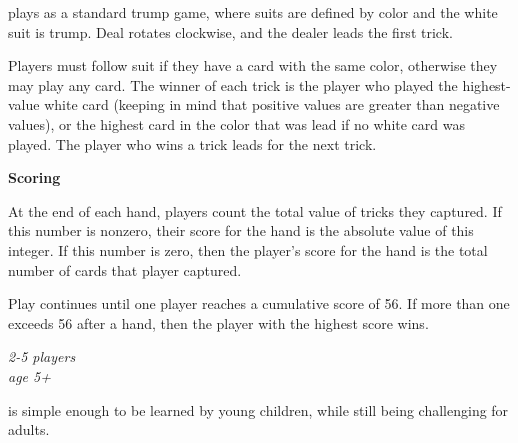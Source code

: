 \documentclass[11pt]{article}
\newcommand\myssection[1]{\begin{center}\bf\small\noindent #1\end{center}}
\begin{document}
 plays as a standard trump game, where suits
are defined by color and the white suit is trump.  Deal rotates
clockwise, and the dealer leads the first trick.

Players must follow suit if they have a card with the same color,
otherwise they may play any card.  The winner of each trick is the
player who played the highest-value white card (keeping in mind that
positive values are greater than negative values), or the highest
card in the color that was lead if no white card was played.  The player
who wins a trick leads for the next trick.

\clearpage
{}

\myssection{Scoring} At the end of each hand, players count the
total value of tricks they captured.  If this number is nonzero, their
score for the hand is the absolute value of this integer.  If this
number is zero, then the player's score for the hand is the total
number of cards that player captured.

Play continues until one player reaches a cumulative score of 56.  If
more than one exceeds 56 after a hand, then the player with the
highest score wins.

\clearpage
{}

\vspace{-0.2in}
\begin{center}
  \em 2-5 players\\
  age 5+
\end{center}

 is simple enough to be learned by young
children, while still being challenging for adults.
\end{document}
